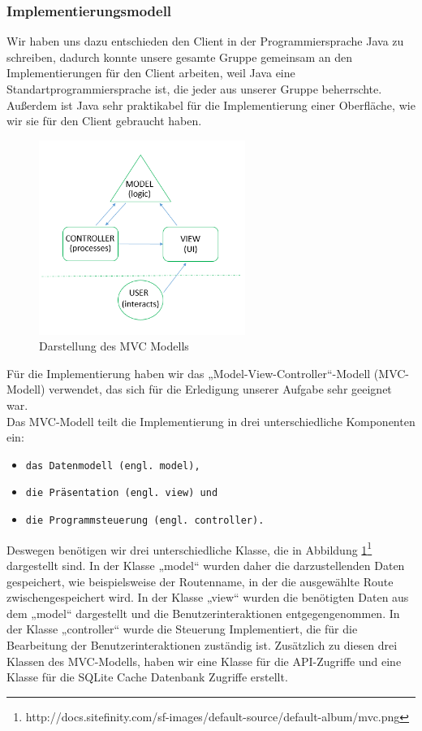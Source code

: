 \documentclass[12pt,a4paper,ngerman,english]{report}
\begin{document}
\subsubsection{Implementierungsmodell}
Wir haben uns dazu entschieden den Client in der Programmiersprache Java zu schreiben, dadurch konnte unsere gesamte Gruppe gemeinsam an den Implementierungen für den Client arbeiten, weil Java eine Standartprogrammiersprache ist, die jeder aus unserer Gruppe beherrschte. Außerdem ist Java sehr praktikabel für die Implementierung einer Oberfläche, wie wir sie für den Client gebraucht haben.\\

\begin{figure}[h]
  \centering
  \includegraphics[width=0.6\textwidth]{img/mvc.png}
  \caption{Darstellung des MVC Modells}
  \label{fig:MVC}
\end{figure}

Für die Implementierung haben wir das „Model-View-Controller“-Modell (MVC-Modell) verwendet, das sich für die Erledigung unserer Aufgabe sehr geeignet war.\\
Das MVC-Modell teilt die Implementierung in drei unterschiedliche Komponenten ein:	
\begin{itemize}
	\setlength\itemsep{0.1em}
	\item \texttt{das Datenmodell (engl. model),}
	\item \texttt{die Präsentation (engl. view) und}
	\item \texttt{die Programmsteuerung (engl. controller).}
\end{itemize}
\newpage
Deswegen benötigen wir drei unterschiedliche Klasse, die in Abbildung \ref{fig:MVC}\footnote{http://docs.sitefinity.com/sf-images/default-source/default-album/mvc.png} dargestellt sind. In der Klasse „model“ wurden daher die darzustellenden Daten gespeichert, wie beispielsweise der Routenname, in der die ausgewählte Route zwischengespeichert wird. In der Klasse „view“ wurden die benötigten Daten aus dem „model“ dargestellt und die Benutzerinteraktionen entgegengenommen. In der Klasse „controller“ wurde die Steuerung Implementiert, die für die Bearbeitung der Benutzerinteraktionen zuständig ist. Zusätzlich zu diesen drei Klassen des MVC-Modells, haben wir eine Klasse für die API-Zugriffe und eine Klasse für die SQLite Cache Datenbank Zugriffe erstellt.
\end{document}
